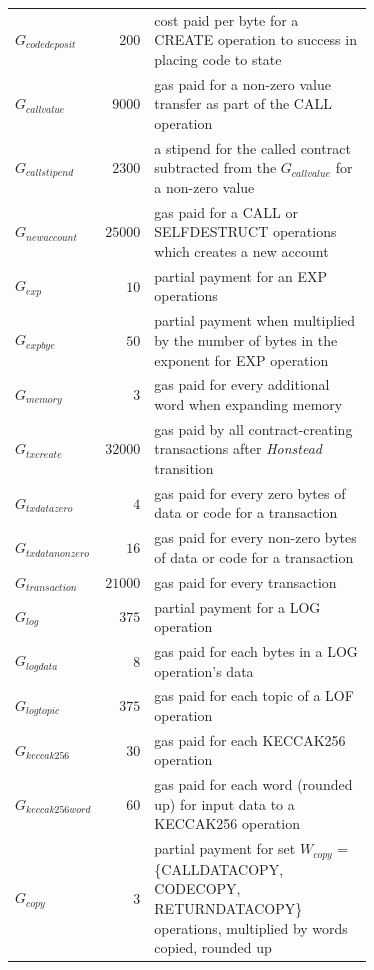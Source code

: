 \documentclass{article}
\begin{document}
\begin{itemize}
\begin{itemize}
\begin{table}[ht!]
\begin{center}
\begin{tabular}{l r p{0.71\linewidth}}
                    $G_{codedeposit}$ & $200$ & cost paid per byte for a CREATE operation to success in placing code to state \\
                    $G_{callvalue}$ & $9000$ & gas paid for a non-zero value transfer as part of the CALL operation \\
                    $G_{callstipend}$ & $2300$ & a stipend for the called contract subtracted from the $G_{callvalue}$ for a non-zero value \\
                    $G_{newaccount}$ & $25000$ & gas paid for a CALL or SELFDESTRUCT operations which creates a new account \\
                    $G_{exp}$ & $10$ & partial  payment for an EXP operations \\
                    $G_{expbye}$ & $50$ & partial payment when multiplied by the number of bytes in the exponent for EXP operation \\
                    $G_{memory}$ & $3$ & gas paid for every additional word when expanding memory \\
                    $G_{txcreate}$ & $32000$ & gas paid by all contract-creating transactions after \textit{Honstead} transition \\
                    $G_{txdatazero}$ & $4$ & gas paid for every zero bytes of data or code for a transaction \\
                    $G_{txdatanonzero}$ & $16$ & gas paid for every non-zero bytes of data or code for a transaction \\
                    $G_{transaction}$ & $21000$ & gas paid for every transaction \\
                    $G_{log}$ & $375$ & partial payment for a LOG operation  \\
                    $G_{logdata}$ & $8$ & gas paid for each bytes in a LOG operation's data \\
                    $G_{logtopic}$ & $375$ & gas paid for each topic of a LOF operation \\
                    $G_{keccak256}$ & $30$ & gas paid for each KECCAK256 operation \\
                    $G_{keccak256word}$ & $60$ & gas paid for each word (rounded up) for input data to a KECCAK256 operation \\
                    $G_{copy}$ & $3$ & partial payment for set $W_{copy}$ = \{CALLDATACOPY, CODECOPY, RETURNDATACOPY\} operations, multiplied by words copied, rounded up \\

\end{tabular}
\end{center}
\end{table}
\end{itemize}
\end{itemize}
\end{document}
